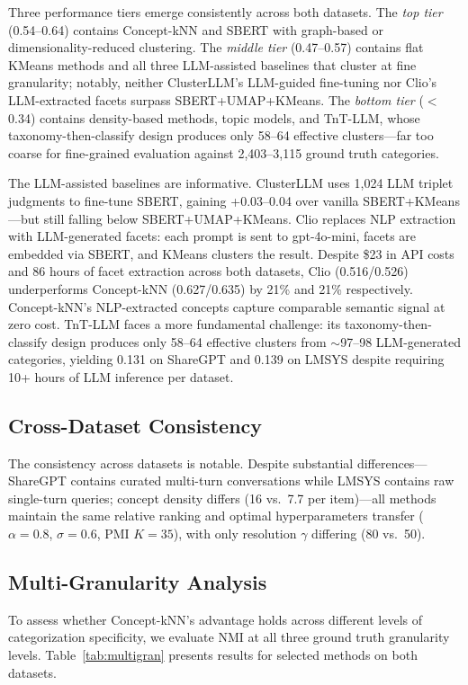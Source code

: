\documentclass[conference]{IEEEtran}
\begin{document}
Three performance tiers emerge consistently across both datasets. The \textit{top tier} (0.54--0.64) contains Concept-kNN and SBERT with graph-based or dimensionality-reduced clustering. The \textit{middle tier} (0.47--0.57) contains flat KMeans methods and all three LLM-assisted baselines that cluster at fine granularity; notably, neither ClusterLLM's LLM-guided fine-tuning nor Clio's LLM-extracted facets surpass SBERT+UMAP+KMeans. The \textit{bottom tier} ($<$0.34) contains density-based methods, topic models, and TnT-LLM, whose taxonomy-then-classify design produces only 58--64 effective clusters---far too coarse for fine-grained evaluation against 2,403--3,115 ground truth categories.

The LLM-assisted baselines are informative. ClusterLLM uses 1,024 LLM triplet judgments to fine-tune SBERT, gaining +0.03--0.04 over vanilla SBERT+KMeans---but still falling below SBERT+UMAP+KMeans. Clio replaces NLP extraction with LLM-generated facets: each prompt is sent to gpt-4o-mini, facets are embedded via SBERT, and KMeans clusters the result. Despite \$23 in API costs and 86 hours of facet extraction across both datasets, Clio (0.516/0.526) underperforms Concept-kNN (0.627/0.635) by 21\% and 21\% respectively. Concept-kNN's NLP-extracted concepts capture comparable semantic signal at zero cost. TnT-LLM faces a more fundamental challenge: its taxonomy-then-classify design produces only 58--64 effective clusters from $\sim$97--98 LLM-generated categories, yielding 0.131 on ShareGPT and 0.139 on LMSYS despite requiring 10+ hours of LLM inference per dataset.

\subsection{Cross-Dataset Consistency}

The consistency across datasets is notable. Despite substantial differences---ShareGPT contains curated multi-turn conversations while LMSYS contains raw single-turn queries; concept density differs (16 vs.\ 7.7 per item)---all methods maintain the same relative ranking and optimal hyperparameters transfer ($\alpha\!=\!0.8$, $\sigma\!=\!0.6$, PMI $K\!=\!35$), with only resolution $\gamma$ differing (80 vs.\ 50).

\subsection{Multi-Granularity Analysis}

To assess whether Concept-kNN's advantage holds across different levels of categorization specificity, we evaluate NMI at all three ground truth granularity levels. Table~\ref{tab:multigran} presents results for selected methods on both datasets.
\end{document}
